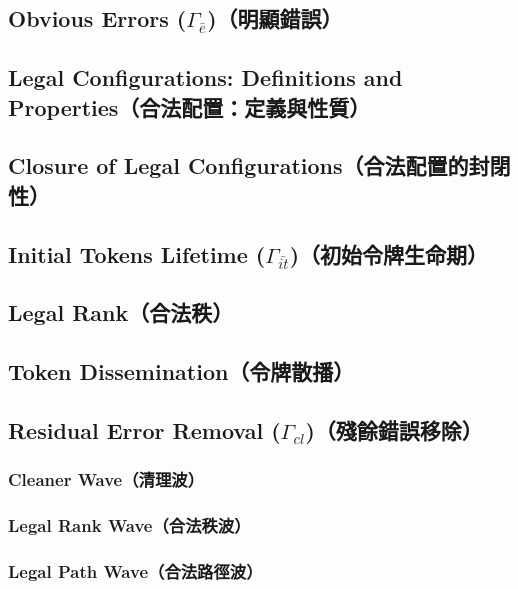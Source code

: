 \documentclass[a4paper, 12pt]{article}
\begin{document}
\subsection{Obvious Errors ($\Gamma_{\bar{e}}$)（明顯錯誤）}
\label{subsec:obvious}

\subsection{Legal Configurations: Definitions and Properties（合法配置：定義與性質）}
\label{sec:legal}

\subsection{Closure of Legal Configurations（合法配置的封閉性）}
\label{sec:closure}

\subsection{Initial Tokens Lifetime ($\Gamma_{\bar{it}}$)（初始令牌生命期）}
\label{subsec:tokenlifetime}

\subsection{Legal Rank（合法秩）}
\label{subsec:legalrank}

\subsection{Token Dissemination（令牌散播）}
\label{sec:tokDis}

\subsection{Residual Error Removal ($\Gamma_{cl}$)（殘餘錯誤移除）}
\label{subsec:residual}

\subsubsection{Cleaner Wave（清理波）}
\label{subsub:clean}

\subsubsection{Legal Rank Wave（合法秩波）}
\label{subsub:goodrank}

\subsubsection{Legal Path Wave（合法路徑波）}
\label{subsub:legalpath}
\end{document}
